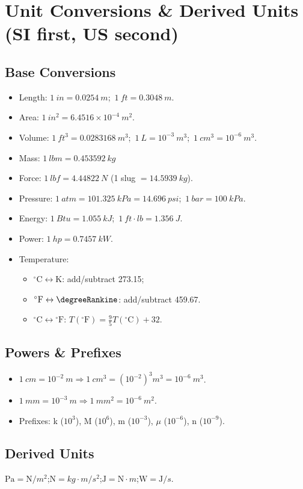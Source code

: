 \documentclass[10pt]{article}
\begin{document}
\section{Unit Conversions \& Derived Units (SI first, US second)}
\begin{multicols}{2}

\subsection{Base Conversions}
\begin{itemize}
    \item Length: $1~\si{in}=0.0254~\si{m}$;\ $1~\si{ft}=0.3048~\si{m}$.
    \item Area: $1~\si{in^2}=6.4516{\times}10^{-4}~\si{m^2}$.
    \item Volume: $1~\si{ft^3}=0.0283168~\si{m^3}$;\ $1~\si{L}=10^{-3}~\si{m^3}$;\ $1~\si{cm^3}=10^{-6}~\si{m^3}$.
    \item Mass: $1~\si{lbm}=0.453592~\si{kg}$
    \item Force: $1~\si{lbf}=4.44822~\si{N}$ (1 slug $=14.5939~\si{kg}$).
    \item Pressure: $1~\si{atm}=101.325~\si{kPa}=14.696~\si{psi}$;\ $1~\si{bar}=100~\si{kPa}$.
    \item Energy: $1~\si{Btu}=1.055~\si{kJ}$;\ $1~\si{ft\cdot lb}=1.356~\si{J}$.
    \item Power: $1~\si{hp}=0.7457~\si{kW}$.
    \item Temperature:
    \begin{itemize}
        \item ${}^{\circ}\mathrm{C}\leftrightarrow \si{\kelvin}$: add/subtract 273.15;\
        \item ${}^{\circ}\mathrm{F}\leftrightarrow \si{\degreeRankine}$: add/subtract 459.67.
        \item ${}^{\circ}\mathrm{C}\leftrightarrow {}^{\circ}\mathrm{F}$: $T(^{\circ}\mathrm{F})=\tfrac{9}{5}T(^{\circ}\mathrm{C})+32$.
    \end{itemize}
\end{itemize}

\subsection{Powers \& Prefixes}
\begin{itemize}
    \item $1~\si{cm}=10^{-2}~\si{m}\Rightarrow 1~\si{cm^3}=(10^{-2})^3\si{m^3}=10^{-6}~\si{m^3}$.
    \item $1~\si{mm}=10^{-3}~\si{m}\Rightarrow 1~\si{mm^2}=10^{-6}~\si{m^2}$.
    \item Prefixes: k ($10^3$), M ($10^6$), m ($10^{-3}$), $\mu$ ($10^{-6}$), n ($10^{-9}$).
\end{itemize}

\subsection{Derived Units}
$\si{\pascal}=\si{\newton}/\si{m^2}$;\quad $\si{\newton}=\si{kg\cdot m/s^2}$;\quad $\si{\joule}=\si{\newton\cdot m}$;\quad $\si{\watt}=\si{\joule}/\si{s}$.

\end{multicols}
\end{document}
